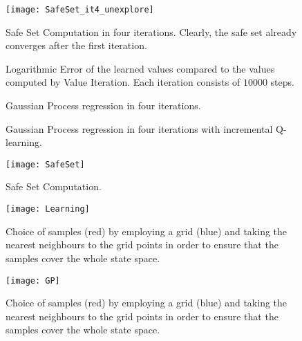\documentclass[../main.tex]{subfiles}
\begin{document}
\begin{figure}
    \centering
    \texttt{[image: SafeSet\_it4\_unexplore]}
        \caption{Safe Set Computation in four iterations. Clearly, the safe set already converges after the first iteration.}  \label{fig:SafeSet_it4_unexplore}
\end{figure}

\begin{figure}
    \centering
        \caption{Logarithmic Error of the learned values compared to the values computed by Value Iteration. Each iteration consists of $10000$ steps.}  \label{fig:Learning_it4_unexplore}
\end{figure}

\begin{figure}
    \centering
        \caption{Gaussian Process regression in four iterations.}  \label{fig:GP_it4_unexplore}
\end{figure}

\begin{figure}
    \centering
        \caption{Gaussian Process regression in four iterations with incremental Q-learning.}  \label{fig:GP_it4_explore}
\end{figure}

\iffalse
\begin{figure}
    \centering
    \texttt{[image: SafeSet]}
        \caption{Safe Set Computation.}  \label{fig:SafeSet}
\end{figure}

\begin{figure}
    \centering
    \texttt{[image: Learning]}
        \caption{Choice of samples (red) by employing a grid (blue) and taking the nearest neighbours to the grid points in order to ensure that the samples cover the whole state space.}  \label{fig:Learning}
\end{figure}

\begin{figure}
    \centering
    \texttt{[image: GP]}
        \caption{Choice of samples (red) by employing a grid (blue) and taking the nearest neighbours to the grid points in order to ensure that the samples cover the whole state space.}  \label{fig:GP}
\end{figure}
\end{document}
